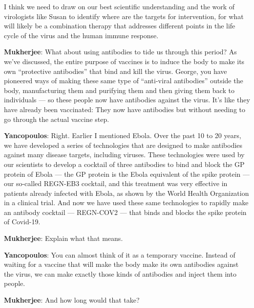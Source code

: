 I think we need to draw on our best scientific understanding and the
work of virologists like Susan to identify where are the targets for
intervention, for what will likely be a combination therapy that
addresses different points in the life cycle of the virus and the human
immune response.

\textbf{Mukherjee}: What about using antibodies to tide us through this
period? As we've discussed, the entire purpose of vaccines is to induce
the body to make its own ``protective antibodies'' that bind and kill
the virus. George, you have pioneered ways of making these same type of
``anti-viral antibodies'' outside the body, manufacturing them and
purifying them and then giving them back to individuals --- so these
people now have antibodies against the virus. It's like they have
already been vaccinated: They now have antibodies but without needing to
go through the actual vaccine step.

\textbf{Yancopoulos}: Right. Earlier I mentioned Ebola. Over the past 10
to 20 years, we have developed a series of technologies that are
designed to make antibodies against many disease targets, including
viruses. These technologies were used by our scientists to develop a
cocktail of three antibodies to bind and block the GP protein of Ebola
--- the GP protein is the Ebola equivalent of the spike protein --- our
so-called REGN-EB3 cocktail, and this treatment was very effective in
patients already infected with Ebola, as shown by the World Health
Organization in a clinical trial. And now we have used these same
technologies to rapidly make an antibody cocktail --- REGN-COV2 --- that
binds and blocks the spike protein of Covid-19.

\textbf{Mukherjee}: Explain what that means.

\textbf{Yancopoulos}: You can almost think of it as a temporary vaccine.
Instead of waiting for a vaccine that will make the body make its own
antibodies against the virus, we can make exactly those kinds of
antibodies and inject them into people.

\textbf{Mukherjee}: And how long would that take?

